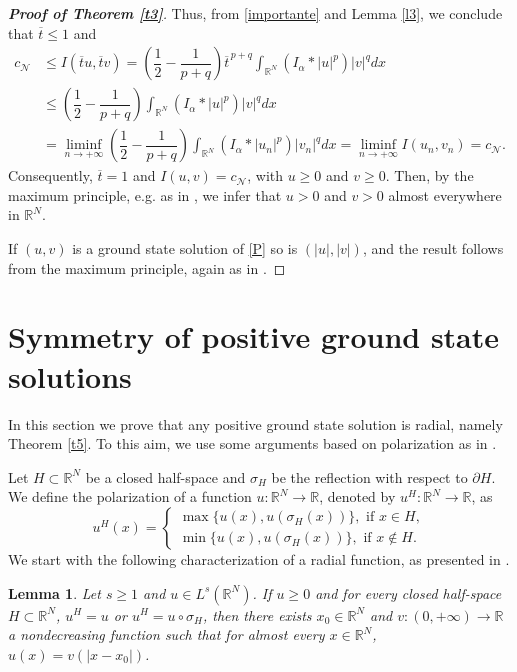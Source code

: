 \documentclass[12pt,a4paper]{article}
\newtheorem{lemma}[theorem]{Lemma}
\numberwithin{equation}{section}
\begin{document}
\begin{proof}[\bf{Proof of Theorem \ref{t3}}]
Thus, from \eqref{importante} and Lemma \ref{l3}, we conclude that $\overline{t} \leq 1$ and
\begin{align}
c_\mathcal{N} & \leq I(\overline{t} u, \overline{t} v) = \left(\dfrac{1}{2}-\dfrac{1}{p+q}\right)\overline{t}^{ \, p+q} \int_{\mathbb{R}^N} (I_\alpha \ast |u|^p)|v|^q dx \\ \nonumber
& \leq \left(\dfrac{1}{2}-\dfrac{1}{p+q}\right)\int_{\mathbb{R}^N} (I_\alpha \ast |u|^p)|v|^q dx \\ \nonumber
& = \liminf\limits_{n\rightarrow +\infty} \left(\dfrac{1}{2}-\dfrac{1}{p+q}\right) \int_{\mathbb{R}^N} (I_\alpha \ast |u_{n}|^p)|v_{n}|^q dx = \liminf\limits_{n\rightarrow +\infty} I(u_{n}, v_{n}) = c_\mathcal{N}. 
\end{align}
Consequently, $\overline{t} =1$ and $I(u, v)=c_\mathcal{N}$, with $u\geq 0$ and $v\geq 0$. Then, by the maximum principle, e.g. as in \cite[Proposition 2.1]{Van2008}, we infer that $u>0$ and $v>0$ almost everywhere in $\mathbb{R}^N$.

\medbreak
If $(u, v)$ is a ground state solution of \eqref{P} so is $(|u|, |v|)$, and the result follows from the maximum principle, again as in \cite[Proposition 2.1]{Van2008}.
\end{proof}

\section{Symmetry of positive ground state solutions}\label{sec-symm}

In this section we prove that any positive ground state solution is radial, namely Theorem \ref{t5}. To this aim, we use some arguments based on polarization as in \cite{Brock1999, Moroz2013}. 

Let $H\subset \mathbb{R}^N$ be a closed half-space and $\sigma_H$ be the reflection with respect to $\partial H$. We define the polarization of a function $u:\mathbb{R}^N \rightarrow \mathbb{R}$, denoted by $u^H : \mathbb{R}^N \rightarrow \mathbb{R}$, as
$$
u^H(x)=\left\{\begin{array}{ll}
\max\{u(x), u(\sigma_H(x))\}, \mbox{ \ \ if } x\in H, \\
\min\{u(x), u(\sigma_H(x))\}, \mbox{ \ \ \ if } x\notin H.
\end{array}\right.
$$ 
We start with the following characterization of a radial function, as presented in \cite[Lemma 5.4]{Moroz2013}.

\begin{lemma}\label{l15}
Let $s\geq 1$ and $u\in L^{s}(\mathbb{R}^N)$. If $u\geq 0$ and for every closed half-space $H\subset \mathbb{R}^N$, $u^H = u$ or $u^H = u \circ \sigma_H$, then there exists $x_0\in \mathbb{R}^N$ and $v:(0, +\infty)\rightarrow \mathbb{R}$ a nondecreasing function such that for almost every $x\in \mathbb{R}^N$, $u(x)=v(|x-x_0|)$.
\end{lemma}
\end{document}
